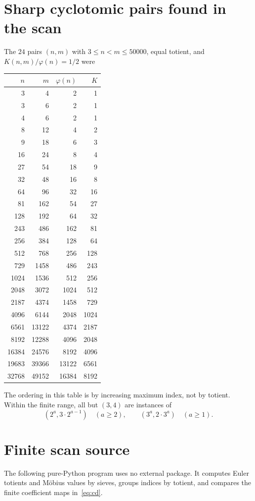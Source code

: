 \documentclass[11pt,oneside]{article}
\theoremstyle{definition}
\theoremstyle{remark}
\begin{document}
\section{Sharp cyclotomic pairs found in the scan}
\label{app:sharp-pairs}

The $24$ pairs $(n,m)$ with $3\le n<m\le50000$, equal totient, and
$K(n,m)/\varphi(n)=1/2$ were
\begin{center}
\begin{tabular}{rrrr}
\toprule
$n$ & $m$ & $\varphi(n)$ & $K$\\
\midrule
3&4&2&1\\
3&6&2&1\\
4&6&2&1\\
8&12&4&2\\
9&18&6&3\\
16&24&8&4\\
27&54&18&9\\
32&48&16&8\\
64&96&32&16\\
81&162&54&27\\
128&192&64&32\\
243&486&162&81\\
256&384&128&64\\
512&768&256&128\\
729&1458&486&243\\
1024&1536&512&256\\
2048&3072&1024&512\\
2187&4374&1458&729\\
4096&6144&2048&1024\\
6561&13122&4374&2187\\
8192&12288&4096&2048\\
16384&24576&8192&4096\\
19683&39366&13122&6561\\
32768&49152&16384&8192\\
\bottomrule
\end{tabular}
\end{center}
The ordering in this table is by increasing maximum index, not by totient.  Within the finite
range, all but $(3,4)$ are instances of
\[
 (2^a,3\cdot2^{a-1})\quad(a\ge2),
 \qquad
 (3^a,2\cdot3^a)\quad(a\ge1).
\]

\section{Finite scan source}
\label{app:code}

The following pure-Python program uses no external package.  It computes Euler totients and
M\"obius values by sieves, groups indices by totient, and compares the finite coefficient maps
in~\eqref{eq:cd}.
\end{document}
